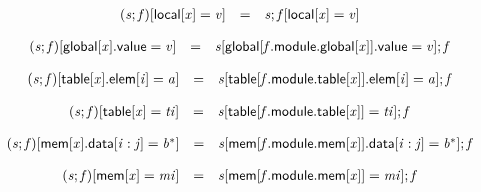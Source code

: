\vspace{1ex}

$$
\begin{array}{@{}lcl@{}l@{}}
({\mathit{s}} ; {\mathit{f}}){}[\mathsf{local}{}[{\mathit{x}}] = {\mathit{v}}] &=& {\mathit{s}} ; {\mathit{f}}{}[\mathsf{local}{}[{\mathit{x}}] = {\mathit{v}}] &  \\
\end{array}
$$

$$
\begin{array}{@{}lcl@{}l@{}}
({\mathit{s}} ; {\mathit{f}}){}[\mathsf{global}{}[{\mathit{x}}].\mathsf{value} = {\mathit{v}}] &=& {\mathit{s}}{}[\mathsf{global}{}[{\mathit{f}}.\mathsf{module}.\mathsf{global}{}[{\mathit{x}}]].\mathsf{value} = {\mathit{v}}] ; {\mathit{f}} &  \\
\end{array}
$$

$$
\begin{array}{@{}lcl@{}l@{}}
({\mathit{s}} ; {\mathit{f}}){}[\mathsf{table}{}[{\mathit{x}}].\mathsf{elem}{}[{\mathit{i}}] = {\mathit{a}}] &=& {\mathit{s}}{}[\mathsf{table}{}[{\mathit{f}}.\mathsf{module}.\mathsf{table}{}[{\mathit{x}}]].\mathsf{elem}{}[{\mathit{i}}] = {\mathit{a}}] ; {\mathit{f}} &  \\
\end{array}
$$

$$
\begin{array}{@{}lcl@{}l@{}}
({\mathit{s}} ; {\mathit{f}}){}[\mathsf{table}{}[{\mathit{x}}] = {\mathit{ti}}] &=& {\mathit{s}}{}[\mathsf{table}{}[{\mathit{f}}.\mathsf{module}.\mathsf{table}{}[{\mathit{x}}]] = {\mathit{ti}}] ; {\mathit{f}} &  \\
\end{array}
$$

$$
\begin{array}{@{}lcl@{}l@{}}
({\mathit{s}} ; {\mathit{f}}){}[\mathsf{mem}{}[{\mathit{x}}].\mathsf{data}{}[{\mathit{i}} : {\mathit{j}}] = {{\mathit{b}}^\ast}] &=& {\mathit{s}}{}[\mathsf{mem}{}[{\mathit{f}}.\mathsf{module}.\mathsf{mem}{}[{\mathit{x}}]].\mathsf{data}{}[{\mathit{i}} : {\mathit{j}}] = {{\mathit{b}}^\ast}] ; {\mathit{f}} &  \\
\end{array}
$$

$$
\begin{array}{@{}lcl@{}l@{}}
({\mathit{s}} ; {\mathit{f}}){}[\mathsf{mem}{}[{\mathit{x}}] = {\mathit{mi}}] &=& {\mathit{s}}{}[\mathsf{mem}{}[{\mathit{f}}.\mathsf{module}.\mathsf{mem}{}[{\mathit{x}}]] = {\mathit{mi}}] ; {\mathit{f}} &  \\
\end{array}
$$

